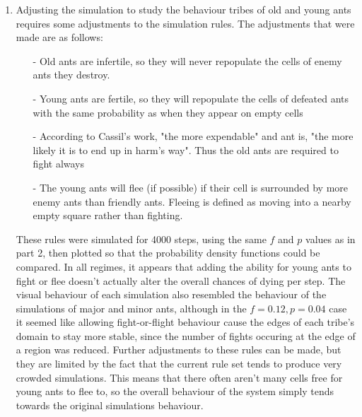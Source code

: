 \begin{enumerate}
\item Adjusting the simulation to study the behaviour tribes of old and young 
ants requires some adjustments to the simulation rules.  The adjustments that 
were made are as follows:

\begin{itemize}
\item[-]Old ants are infertile, so they will never repopulate the cells of 
enemy ants they destroy.
\item[-]Young ants are fertile, so they will repopulate the cells of defeated 
ants with the same probability as when they appear on empty cells
\item[-]According to Cassil's work, "the more expendable" and ant is, "the more 
likely it is to end up in harm's way".  Thus the old ants are required to fight 
always
\item[-]The young ants will flee (if possible) if their cell is surrounded by
more enemy ants than friendly ants.  Fleeing is defined as moving into a nearby 
empty square rather than fighting.
\end{itemize}

These rules were simulated for 4000 steps, using the same $f$ and $p$ values as 
in part 2, then plotted so that the probability density functions could be 
compared.  In all regimes, it appears that adding the ability for young ants to 
fight or flee doesn't actually alter the overall chances of dying per step.  
The visual behaviour of each simulation also resembled the behaviour of the 
simulations of major and minor ants, although in the $f = 0.12, p = 0.04$ case 
it seemed like allowing fight-or-flight behaviour cause the edges of each 
tribe's domain to stay more stable, since the number of fights occuring at the 
edge of a region was reduced.  Further adjustments to these rules can be made, but
they are limited by the fact that the current rule set tends to produce very 
crowded simulations.  This means that there often aren't many cells free for 
young ants to flee to, so the overall behaviour of the system simply tends 
towards the original simulations behaviour.


\end{enumerate}
